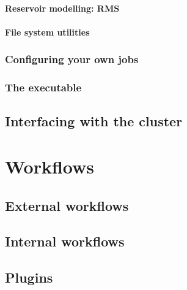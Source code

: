 \documentclass[a4paper,10pt,english]{sphinxmanual}
\begin{document}
\subsubsection{Reservoir modelling: RMS}
\label{\detokenize{forward_model/index:reservoir-modelling-rms}}

\subsubsection{File system utilities}
\label{\detokenize{forward_model/index:file-system-utilities}}

\subsection{Configuring your own jobs}
\label{\detokenize{forward_model/index:configuring-your-own-jobs}}

\subsection{The  executable}
\label{\detokenize{forward_model/index:the-job-dispatch-executable}}

\section{Interfacing with the cluster}
\label{\detokenize{forward_model/index:interfacing-with-the-cluster}}

\chapter{Workflows}
\label{\detokenize{workflows/index::doc}}\label{\detokenize{workflows/index:workflows}}

\section{External workflows}
\label{\detokenize{workflows/index:external-workflows}}

\section{Internal workflows}
\label{\detokenize{workflows/index:internal-workflows}}

\section{Plugins}
\label{\detokenize{workflows/index:plugins}}
\end{document}
